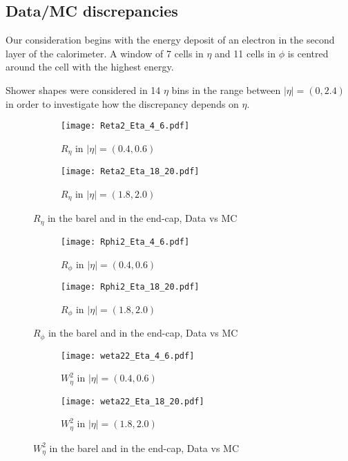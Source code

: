  \subsection{Data/MC discrepancies}
  Our consideration begins with the energy deposit of an electron in the second layer of the calorimeter. A window of 7 cells in $\eta$ and 11 cells in $\phi$ is centred around the cell with the highest energy.

  Shower shapes were considered in 14 $\eta$ bins in the range between $|\eta| = (0,2.4)$ in order to investigate how the discrepancy depends on $\eta$. 
    	\begin{figure}[htbp]
  	\begin{subfigure}[t]{0.5\textwidth}
  		\texttt{[image: Reta2\_Eta\_4\_6.pdf]}
  		\caption{$R_{\eta}$ in $|\eta| = (0.4,0.6)$ }
  		\label{fig::reta_norew_04}
  	\end{subfigure}
  	\hfill
  	\begin{subfigure}[t]{0.5\textwidth} 
  		\texttt{[image: Reta2\_Eta\_18\_20.pdf]}
  		\caption{$R_{\eta}$ in $|\eta| = (1.8,2.0)$ }
  		\label{fig::reta_norew_18}
  	\end{subfigure}
  	\caption{$R_{\eta}$ in the barel and in the end-cap, Data vs MC}
  	\label{fig::reta_norew}
  \end{figure}

    \begin{figure}[htbp]
	\begin{subfigure}[t]{0.5\textwidth}
		\texttt{[image: Rphi2\_Eta\_4\_6.pdf]}
		\caption{$R_{\phi}$ in $|\eta| = (0.4,0.6)$ }
		\label{fig::rphi_norew_04}
	\end{subfigure}
	\hfill
	\begin{subfigure}[t]{0.5\textwidth} 
		\texttt{[image: Rphi2\_Eta\_18\_20.pdf]}
		\caption{$R_{\phi}$ in $|\eta| = (1.8,2.0)$ }
		\label{fig::rphi_norew_18}
	\end{subfigure}
	\caption{$R_{\phi}$ in the barel and in the end-cap, Data vs MC}
	\label{fig::rphi_norew}
\end{figure}
  
    \begin{figure}[htbp]
	\begin{subfigure}[t]{0.5\textwidth}
		\texttt{[image: weta22\_Eta\_4\_6.pdf]}
		\caption{$W_{\eta}^2$ in $|\eta| = (0.4,0.6)$ }
		\label{fig::weta2_norew_04}
	\end{subfigure}
	\hfill
	\begin{subfigure}[t]{0.5\textwidth} 
		\texttt{[image: weta22\_Eta\_18\_20.pdf]}
		\caption{$W_{\eta}^2$ in $|\eta| = (1.8,2.0)$ }
		\label{fig::weta2_norew_18}
	\end{subfigure}
	\caption{$W_{\eta}^2$ in the barel and in the end-cap, Data vs MC}
	\label{fig::weta2_norew}
\end{figure}



